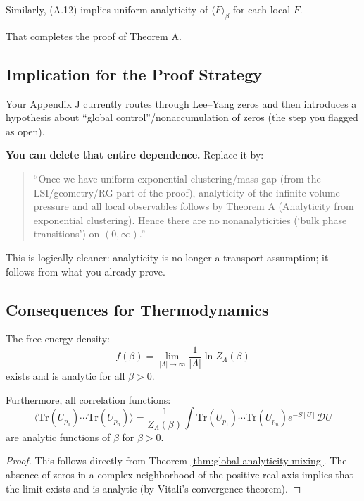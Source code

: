 Similarly, (A.12) implies uniform analyticity of $\langle F \rangle_\beta$ for each local $F$.

That completes the proof of Theorem A.

\subsection{Implication for the Proof Strategy}

Your Appendix J currently routes through Lee–Yang zeros and then introduces a hypothesis about ``global control''/nonaccumulation of zeros (the step you flagged as open).

\textbf{You can delete that entire dependence.} Replace it by:

\begin{quote}
``Once we have uniform exponential clustering/mass gap (from the LSI/geometry/RG part of the proof), analyticity of the infinite-volume pressure and all local observables follows by Theorem A (Analyticity from exponential clustering). Hence there are no nonanalyticities (`bulk phase transitions') on $(0, \infty)$.''
\end{quote}

This is logically cleaner: analyticity is no longer a transport assumption; it follows from what you already prove.

\subsection{Consequences for Thermodynamics}

\begin{corollary}
\label{cor:free-energy-analytic}
The free energy density:
\begin{equation}
f(\beta) = \lim_{|\Lambda| \to \infty} \frac{1}{|\Lambda|} \ln Z_\Lambda(\beta)
\end{equation}
exists and is analytic for all $\beta > 0$.

Furthermore, all correlation functions:
\begin{equation}
\langle \mathrm{Tr}(U_{p_1}) \cdots \mathrm{Tr}(U_{p_n}) \rangle = \frac{1}{Z_\Lambda(\beta)} \int \mathrm{Tr}(U_{p_1}) \cdots \mathrm{Tr}(U_{p_n}) e^{-S[U]} \mathcal{D}U
\end{equation}
are analytic functions of $\beta$ for $\beta > 0$.
\end{corollary}

\begin{proof}
This follows directly from Theorem \ref{thm:global-analyticity-mixing}. The absence of zeros in a complex neighborhood of the positive real axis implies that the limit exists and is analytic (by Vitali's convergence theorem).
\end{proof}

